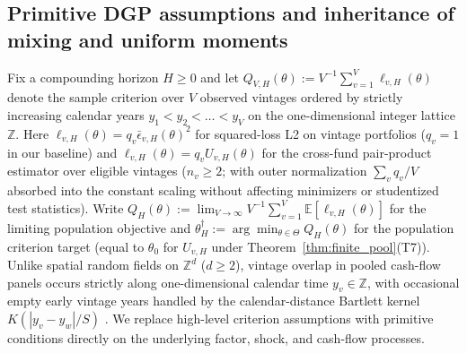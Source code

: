 \subsection{Primitive DGP assumptions and inheritance of mixing and uniform moments}
\label{sec:primitive_assumptions}

Fix a compounding horizon $H \ge 0$ and let $Q_{V,H}(\theta) := V^{-1}\sum_{v=1}^V \ell_{v,H}(\theta)$ denote the sample criterion over $V$ observed vintages ordered by strictly increasing calendar years $y_1 < y_2 < \dots < y_V$ on the one-dimensional integer lattice $\mathbb{Z}$.
Here $\ell_{v,H}(\theta) = q_v \bar\epsilon_{v,H}(\theta)^2$ for squared-loss L2 on vintage portfolios ($q_v = 1$ in our baseline) and $\ell_{v,H}(\theta) = q_v U_{v,H}(\theta)$ for the cross-fund pair-product estimator over eligible vintages ($n_v \ge 2$; with outer normalization $\sum_v q_v / V$ absorbed into the constant scaling without affecting minimizers or studentized test statistics).
Write $Q_H(\theta) := \lim_{V\to\infty} V^{-1}\sum_{v=1}^V \mathbb{E}[\ell_{v,H}(\theta)]$ for the limiting population objective and $\theta_H^\dagger := \arg\min_{\theta\in\Theta} Q_H(\theta)$ for the population criterion target (equal to $\theta_0$ for $U_{v,H}$ under Theorem~\ref{thm:finite_pool}(T7)).
Unlike spatial random fields on $\mathbb{Z}^d$ ($d \ge 2$), vintage overlap in pooled cash-flow panels occurs strictly along one-dimensional calendar time $y_v \in \mathbb{Z}$, with occasional empty early vintage years handled by the calendar-distance Bartlett kernel $K(|y_v - y_w|/S)$ \citep{C99,KS11}.
We replace high-level criterion assumptions with primitive conditions directly on the underlying factor, shock, and cash-flow processes.


